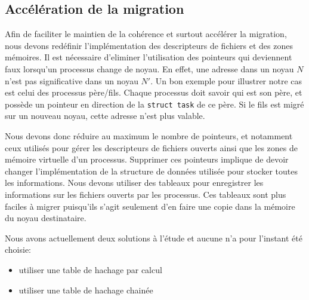 

    \subsection{Accélération de la migration}

      Afin de faciliter le maintien de la cohérence et surtout accélérer la
      migration, nous devons redéfinir l'implémentation des descripteurs de
      fichiers et des zones mémoires. Il est nécessaire d'eliminer l'utilisation
      des pointeurs qui deviennent faux lorsqu'un processus change de noyau. En
      effet, une adresse dans un noyau $N$ n'est pas significative dans un noyau
      $N'$. Un bon exemple pour illustrer notre cas est celui des processus
      père/fils. Chaque processus doit savoir qui est son père, et possède un
      pointeur en direction de la \texttt{struct task} de ce père. Si le fils
      est migré sur un nouveau noyau, cette adresse n'est plus valable.

      Nous devons donc réduire au maximum le nombre de pointeurs, et notamment
      ceux utilisés pour gérer les descripteurs de fichiers ouverts ainsi que
      les zones de mémoire virtuelle d'un processus. Supprimer ces pointeurs
      implique de devoir changer l'implémentation de la structure de données
      utilisée pour stocker toutes les informations. Nous devons utiliser des
      tableaux pour enregistrer les informations sur les fichiers ouverts par
      les processus. Ces tableaux sont plus faciles à migrer puisqu'ils s'agit
      seulement d'en faire une copie dans la mémoire du noyau destinataire.

      Nous avons actuellement deux solutions à l'étude et aucune n'a pour
      l'instant été choisie:
      \begin{itemize}
        \item utiliser une table de hachage par calcul
        \item utiliser une table de hachage chainée
      \end{itemize}

